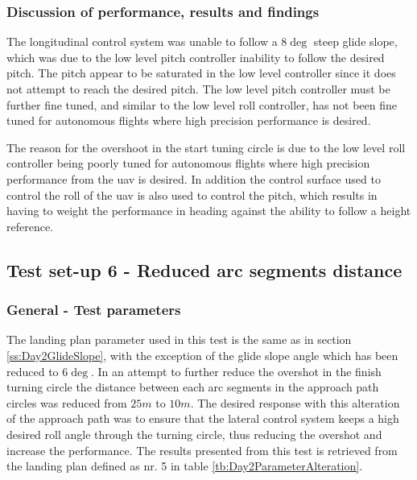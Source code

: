 \subsubsection{Discussion of performance, results and findings}
The longitudinal control system was unable to follow a $8 \deg$ steep glide slope, which was due to the low level pitch controller inability to follow the desired pitch. The pitch appear to be saturated in the low level controller since it does not attempt to reach the desired pitch. The low level pitch controller must be further fine tuned, and similar to the low level roll controller, has not been fine tuned for autonomous flights where high precision performance is desired.

The reason for the overshoot in the start tuning circle is due to the low level roll controller being poorly tuned for autonomous flights where high precision performance from the \gls{uav} is desired. In addition the control surface used to control the roll of the \gls{uav} is also used to control the pitch, which results in having to weight the performance in heading against the ability to follow a height reference.
\subsection{Test set-up 6 - Reduced arc segments distance}\label{ss:Day2ArcDistance}
\subsubsection{General - Test parameters}
The landing plan parameter used in this test is the same as in section \ref{ss:Day2GlideSlope}, with the exception of the glide slope angle which has been reduced to $6 \deg$. In an attempt to further reduce the overshot in the finish turning circle the distance between each arc segments in the approach path circles was reduced from $25 m$ to $10 m$. The desired response with this alteration of the approach path was to ensure that the lateral control system keeps a high desired roll angle through the turning circle, thus reducing the overshot and increase the performance. The results presented from this test is retrieved from the landing plan defined as nr. 5 in table \ref{tb:Day2ParameterAlteration}.

